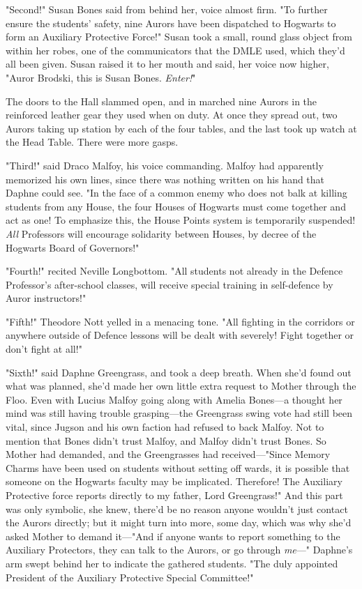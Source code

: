 "Second!" Susan Bones said from behind her, voice almost firm. "To further
ensure the students' safety, nine Aurors have been dispatched to Hogwarts to
form an Auxiliary Protective Force!" Susan took a small, round glass object
from within her robes, one of the communicators that the DMLE used, which
they'd all been given. Susan raised it to her mouth and said, her voice now
higher, "Auror Brodski, this is Susan Bones. \emph{Enter!}"

The doors to the Hall slammed open, and in marched nine Aurors in the
reinforced leather gear they used when on duty. At once they spread out, two
Aurors taking up station by each of the four tables, and the last took up watch
at the Head Table. There were more gasps.

"Third!" said Draco Malfoy, his voice commanding. Malfoy had apparently
memorized his own lines, since there was nothing written on his hand that
Daphne could see. "In the face of a common enemy who does not balk at killing
students from any House, the four Houses of Hogwarts must come together and act
as one! To emphasize this, the House Points system is temporarily suspended!
\emph{All} Professors will encourage solidarity between Houses, by decree of
the Hogwarts Board of Governors!"

"Fourth!" recited Neville Longbottom. "All students not already in the Defence
Professor's after-school classes, will receive special training in self-defence
by Auror instructors!"

"Fifth!" Theodore Nott yelled in a menacing tone. "All fighting in the
corridors or anywhere outside of Defence lessons will be dealt with severely!
Fight together or don't fight at all!"

"Sixth!" said Daphne Greengrass, and took a deep breath. When she'd found out
what was planned, she'd made her own little extra request to Mother through the
Floo. Even with Lucius Malfoy going along with Amelia Bones---a thought her
mind was still having trouble grasping---the Greengrass swing vote had still
been vital, since Jugson and his own faction had refused to back Malfoy. Not to
mention that Bones didn't trust Malfoy, and Malfoy didn't trust Bones. So
Mother had demanded, and the Greengrasses had received---"Since Memory Charms
have been used on students without setting off wards, it is possible that
someone on the Hogwarts faculty may be implicated. Therefore! The Auxiliary
Protective force reports directly to my father, Lord Greengrass!" And this part
was only symbolic, she knew, there'd be no reason anyone wouldn't just contact
the Aurors directly; but it might turn into more, some day, which was why she'd
asked Mother to demand it---"And if anyone wants to report something to the
Auxiliary Protectors, they can talk to the Aurors, or go through \emph{me}---"
Daphne's arm swept behind her to indicate the gathered students. "The duly
appointed President of the Auxiliary Protective Special Committee!"

